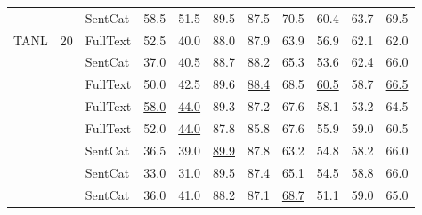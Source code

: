 \begin{tabular}{lllllllllll}
    &    & SentCat &                       58.5 &                       51.5 &                       89.5 &                       87.5 &                       70.5 &                       60.4 &                       63.7 &                       69.5 \\
TANL & 20 & FullText &                       52.5 &                       40.0 &                       88.0 &                       87.9 &                       63.9 &                       56.9 &                       62.1 &                       62.0 \\
    &    & SentCat &                       37.0 &                       40.5 &                       88.7 &                       88.2 &                       65.3 &                       53.6 &           \underline{62.4} &                       66.0 \\
    &    & FullText &                       50.0 &                       42.5 &                       89.6 &           \underline{88.4} &                       68.5 &           \underline{60.5} &                       58.7 &           \underline{66.5} \\
    &    & FullText &           \underline{58.0} &           \underline{44.0} &                       89.3 &                       87.2 &                       67.6 &                       58.1 &                       53.2 &                       64.5 \\
    &    & FullText &                       52.0 &           \underline{44.0} &                       87.8 &                       85.8 &                       67.6 &                       55.9 &                       59.0 &                       60.5 \\
    &    & SentCat &                       36.5 &                       39.0 &           \underline{89.9} &                       87.8 &                       63.2 &                       54.8 &                       58.2 &                       66.0 \\
    &    & SentCat &                       33.0 &                       31.0 &                       89.5 &                       87.4 &                       65.1 &                       54.5 &                       58.8 &                       66.0 \\
    &    & SentCat &                       36.0 &                       41.0 &                       88.2 &                       87.1 &           \underline{68.7} &                       51.1 &                       59.0 &                       65.0 \\

\end{tabular}
